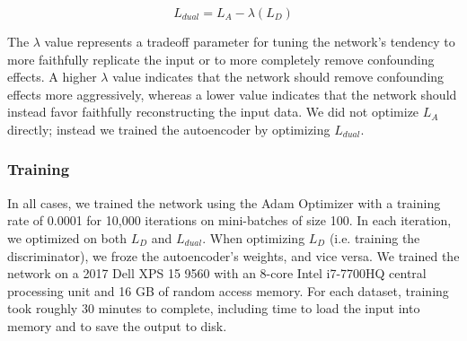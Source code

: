\documentclass[11pt]{article}
\begin{document}
\begin{equation}
	\label{dual_loss}
	L_{dual} = L_A - \lambda{}(L_D)
\end{equation}

The $\lambda$ value represents a tradeoff parameter for tuning the network's tendency to more faithfully replicate the input or to more completely remove confounding effects.
A higher $\lambda$ value indicates that the network should remove confounding effects more aggressively, whereas a lower value indicates that the network should instead favor faithfully reconstructing the input data.
We did not optimize $L_A$ directly; instead we trained the autoencoder by optimizing $L_{dual}$.

\subsubsection{Training}

In all cases, we trained the network using the Adam Optimizer \citep{kingma_adam_2014} with a training rate of 0.0001 for 10,000 iterations on mini-batches of size 100.
In each iteration, we optimized on both $L_D$ and $L_{dual}$.
When optimizing $L_D$ (i.e. training the discriminator), we froze the autoencoder's weights, and vice versa.
We trained the network on a 2017 Dell XPS 15 9560 with an 8-core Intel i7-7700HQ central processing unit and 16 GB of random access memory.
For each dataset, training took roughly 30 minutes to complete, including time to load the input into memory and to save the output to disk.
\end{document}
